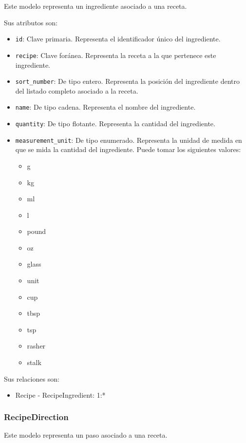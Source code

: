 Este modelo representa un ingrediente asociado a una receta.

Sus atributos son:
\begin{itemize}
\item \texttt{id}: Clave primaria. Representa el identificador único del
  ingrediente.
\item \texttt{recipe}: Clave foránea. Representa la receta a la que pertenece
  este ingrediente.
\item \texttt{sort\_number}: De tipo entero. Representa la posición del
  ingrediente dentro del listado completo asociado a la receta.
\item \texttt{name}: De tipo cadena. Representa el nombre del ingrediente.
\item \texttt{quantity}: De tipo flotante. Representa la cantidad del
  ingrediente.
\item \texttt{measurement\_unit}: De tipo enumerado. Representa la unidad de
  medida en que se mida la cantidad del ingrediente. Puede tomar los siguientes
  valores:
  \begin{itemize}
  \item g
  \item kg
  \item ml
  \item l
  \item pound
  \item oz
  \item glass
  \item unit
  \item cup
  \item tbsp
  \item tsp
  \item rasher
  \item stalk
  \end{itemize}
\end{itemize}

Sus relaciones son:
\begin{itemize}
\item Recipe - RecipeIngredient: 1:*
\end{itemize}


\subsubsection{RecipeDirection}

Este modelo representa un paso asociado a una receta.

